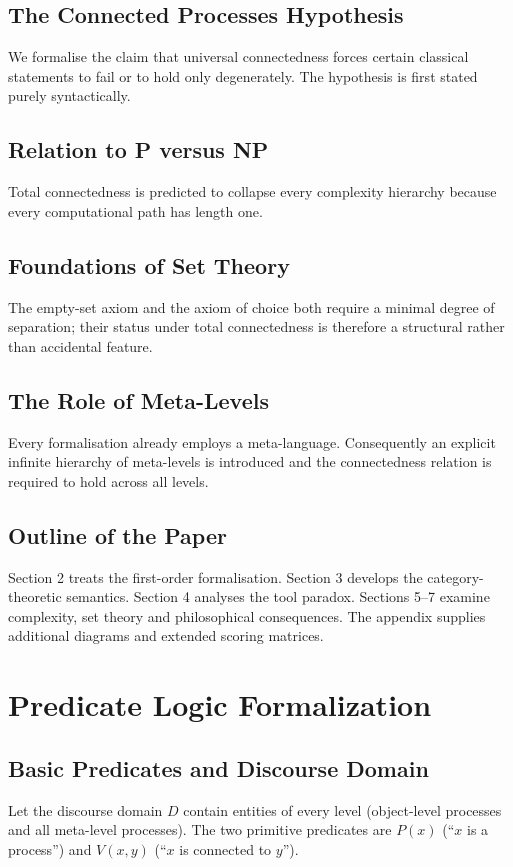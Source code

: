 \documentclass[11pt,a4paper]{article}
\theoremstyle{definition}
\begin{document}
\subsection{The Connected Processes Hypothesis}
We formalise the claim that universal connectedness forces certain classical statements to fail or to hold only degenerately. The hypothesis is first stated purely syntactically.

\subsection{Relation to P versus NP}
Total connectedness is predicted to collapse every complexity hierarchy because every computational path has length one.

\subsection{Foundations of Set Theory}
The empty-set axiom and the axiom of choice both require a minimal degree of separation; their status under total connectedness is therefore a structural rather than accidental feature.

\subsection{The Role of Meta-Levels}
Every formalisation already employs a meta-language. Consequently an explicit infinite hierarchy of meta-levels is introduced and the connectedness relation is required to hold across all levels.

\subsection{Outline of the Paper}
Section 2 treats the first-order formalisation. Section 3 develops the category-theoretic semantics. Section 4 analyses the tool paradox. Sections 5–7 examine complexity, set theory and philosophical consequences. The appendix supplies additional diagrams and extended scoring matrices.

\section{Predicate Logic Formalization}
\subsection{Basic Predicates and Discourse Domain}
Let the discourse domain \(D\) contain entities of every level (object-level processes and all meta-level processes). The two primitive predicates are \(P(x)\) (“\(x\) is a process”) and \(V(x,y)\) (“\(x\) is connected to \(y\)”).
\end{document}
